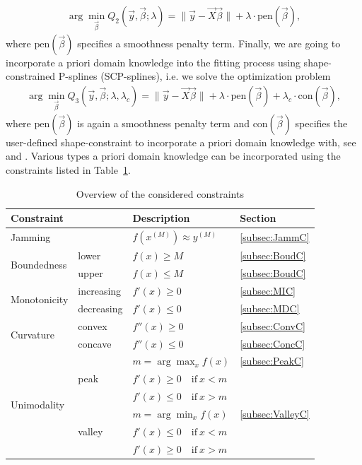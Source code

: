 \documentclass[10pt,a4paper]{report}
\begin{document}
\begin{align} \label{eq:OF-P-splines}
	\arg \min_{\vec{\beta}} Q_2(\vec{y}, \vec{\beta}; \lambda) = \lVert \vec{y} - \vec{X} \vec{\beta} \rVert + \lambda \cdot \text{pen}(\vec{\beta}),
\end{align}
%
where $\text{pen}(\vec{\beta})$ specifies a smoothness penalty term. Finally, we are going to incorporate a priori domain knowledge into the fitting process using shape-constrained P-splines (SCP-splines), i.e. we solve the optimization problem
\begin{align} \label{eq:OF-SCP-splines}
	\arg \min_{\vec{\beta}} Q_3(\vec{y}, \vec{\beta}; \lambda, \lambda_c) = \lVert \vec{y} - \vec{X} \vec{\beta} \rVert + \lambda \cdot \text{pen}(\vec{\beta}) + \lambda_c \cdot \text{con}(\vec{\beta}),
\end{align}
%
where $\text{pen}(\vec{\beta})$ is again a smoothness penalty term and $\text{con}({\vec{\beta}})$ specifies the user-defined shape-constraint to incorporate a priori domain knowledge with, see \cite{hofner2011monotonicity} and \cite{bollaerts2006simple}. Various types a priori domain knowledge can be incorporated using the constraints listed in Table~\ref{tab:constraint_overview}.

\begin{table}[H]
	\centering
	\begin{tabular}{|l|ll|l|}
		\hline
		\textbf{Constraint}& & \textbf{Description}   & \textbf{Section}     \\ \hline \toprule
		Jamming            & & $f(x^{(M)}) \approx y^{(M)}$ & \ref{subsec:JammC} \\ \hline 
		\multirow{2}{*}{Boundedness}  & lower & $f(x)\ge M$ 	  &	\ref{subsec:BoudC} \\ \cline{2-4}
		& upper & $f(x)\le M$    & \ref{subsec:BoudC} \\ \hline
		\multirow{2}{*}{Monotonicity} & increasing & $f'(x) \ge 0$ 	& \ref{subsec:MIC} \\ \cline{2-4}
		& decreasing & $f'(x) \le 0$  & \ref{subsec:MDC} \\ \hline	
		\multirow{2}{*}{Curvature}    & convex     & $f''(x)\ge 0$ 	& \ref{subsec:ConvC} \\ \cline{2-4}
		& concave    & $f''(x)\le 0$ 	& \ref{subsec:ConcC} \\ \hline
		\multirow{6}{*}{Unimodality}  & \multirow[t]{3}{*}{peak}  & $m = \arg \max_{x} f(x)$  & \ref{subsec:PeakC} \\ 
		&	                       & $f'(x) \ge 0 \quad \text{if} \ x < m$ & \\ 
		&  				       & $f'(x) \le 0 \quad \text{if} \ x > m$ & \\ \cline{2-4} 
		& \multirow[t]{3}{*}{valley}& $m = \arg \min_{x} f(x)$  & \ref{subsec:ValleyC} \\ 
		&	                       & $f'(x) \le 0 \quad \text{if} \ x < m$ & \\ 
		&  				       & $f'(x) \ge 0 \quad \text{if} \ x > m$ &  \\ \hline		\bottomrule
	\end{tabular}
	\caption{Overview of the considered constraints}
	\label{tab:constraint_overview}
\end{table}
\end{document}
